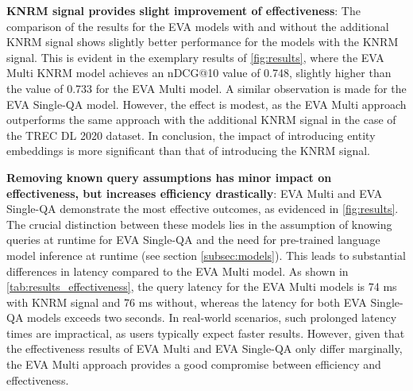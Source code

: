 \textbf{KNRM signal provides slight improvement of effectiveness}:
The comparison of the results for the EVA models with and without the additional KNRM signal shows slightly better performance for the models with the KNRM signal. This is evident in the exemplary results of \autoref{fig:results}, where the EVA Multi KNRM model achieves an nDCG@10 value of 0.748, slightly higher than the value of 0.733 for the EVA Multi model. A similar observation is made for the EVA Single-QA model. However, the effect is modest, as the EVA Multi approach outperforms the same approach with the additional KNRM signal in the case of the TREC DL 2020 dataset. In conclusion, the impact of introducing entity embeddings is more significant than that of introducing the KNRM signal.

\textbf{Removing known query assumptions has minor impact on effectiveness, but increases efficiency drastically}:
EVA Multi and EVA Single-QA demonstrate the most effective outcomes, as evidenced in \autoref{fig:results}. The crucial distinction between these models lies in the assumption of knowing queries at runtime for EVA Single-QA and the need for pre-trained language model inference at runtime (see section \ref{subsec:models}). This leads to substantial differences in latency compared to the EVA Multi model. As shown in \autoref{tab:results_effectiveness}, the query latency for the EVA Multi models is 74 ms with KNRM signal and 76 ms without, whereas the latency for both EVA Single-QA models exceeds two seconds. In real-world scenarios, such prolonged latency times are impractical, as users typically expect faster results. However, given that the effectiveness results of EVA Multi and EVA Single-QA only differ marginally, the EVA Multi approach provides a good compromise between efficiency and effectiveness.
